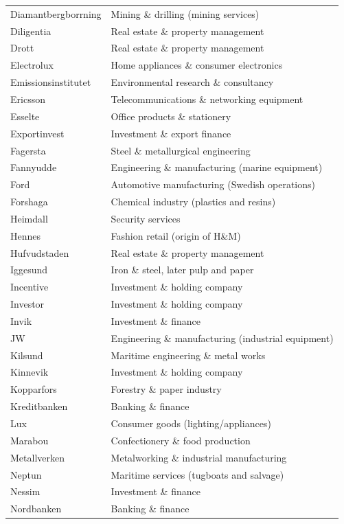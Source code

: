 \documentclass[
]{article}
\begin{document}
\begin{longtable}[]{@{}
  >{\raggedright\arraybackslash}p{}
  >{\raggedright\arraybackslash}p{}@{}}
Diamantbergborrning & Mining \& drilling (mining services) \\
Diligentia & Real estate \& property management \\
Drott & Real estate \& property management \\
Electrolux & Home appliances \& consumer electronics \\
Emissionsinstitutet & Environmental research \& consultancy \\
Ericsson & Telecommunications \& networking equipment \\
Esselte & Office products \& stationery \\
Exportinvest & Investment \& export finance \\
Fagersta & Steel \& metallurgical engineering \\
Fannyudde & Engineering \& manufacturing (marine equipment) \\
Ford & Automotive manufacturing (Swedish operations) \\
Forshaga & Chemical industry (plastics and resins) \\
Heimdall & Security services \\
Hennes & Fashion retail (origin of H\&M) \\
Hufvudstaden & Real estate \& property management \\
Iggesund & Iron \& steel, later pulp and paper \\
Incentive & Investment \& holding company \\
Investor & Investment \& holding company \\
Invik & Investment \& finance \\
JW & Engineering \& manufacturing (industrial equipment) \\
Kilsund & Maritime engineering \& metal works \\
Kinnevik & Investment \& holding company \\
Kopparfors & Forestry \& paper industry \\
Kreditbanken & Banking \& finance \\
Lux & Consumer goods (lighting/appliances) \\
Marabou & Confectionery \& food production \\
Metallverken & Metalworking \& industrial manufacturing \\
Neptun & Maritime services (tugboats and salvage) \\
Nessim & Investment \& finance \\
Nordbanken & Banking \& finance \\

\end{longtable}
\end{document}
